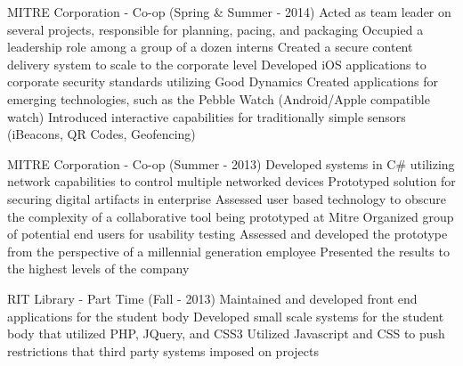 \documentclass{article}
\begin{document}
MITRE Corporation - Co-op (Spring \& Summer - 2014)
Acted as team leader on several projects, responsible for planning, pacing, and packaging
Occupied a leadership role among a group of a dozen interns
Created a secure content delivery system to scale to the corporate level
Developed iOS applications to corporate security standards utilizing Good Dynamics
Created applications for emerging technologies, such as the Pebble Watch (Android/Apple compatible watch)
Introduced interactive capabilities for traditionally simple sensors (iBeacons, QR Codes, Geofencing)

MITRE Corporation - Co-op (Summer - 2013)
Developed systems in C\# utilizing network capabilities to control multiple networked devices
Prototyped solution for securing digital artifacts in enterprise
Assessed user based technology to obscure the complexity of a collaborative tool being prototyped at Mitre
Organized group of potential end users for usability testing
Assessed and developed the prototype from the perspective of a millennial generation employee
Presented the results to the highest levels of the company

RIT Library - Part Time (Fall - 2013)
Maintained and developed front end applications for the student body
Developed small scale systems for the student body that utilized PHP, JQuery, and CSS3 
Utilized Javascript and CSS to push restrictions that third party systems imposed on projects
\end{document}
